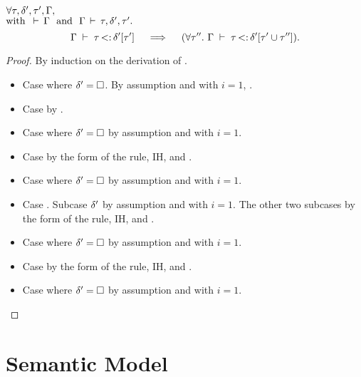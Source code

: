 \begin{lemma}%
\label{lem:add-inner-union-right:app}
    $\forall \tau, \delta', \tau', \Gamma,$\\$\text{with }
    \,\vdash\,\Gamma\ \text{ and }\ \Gamma\,\vdash\,\tau, \delta', \tau'.$
    \[
        \subtydflt{\ty}{\plug{\dctx'}{\ty'}}
        \quad\implies\quad
        (\forall \ty''.\ \subtydflt{\ty}{\plug{\dctx'}{\tyunion{\ty'}{\ty''}}}).
    \]
\end{lemma}
\begin{proof}
    By induction on the derivation of
    .
    \begin{itemize}
        \item Case  where $\delta'=\square$. By assumption
            \subtydflt{\ty}{\tyany} and  with $i=1$,
            .
        \item Case  by .
        \item Case  where $\delta'=\square$
            by assumption and  with $i=1$.
        \item Case  by the form of the rule, IH, and .
        \item Case  where $\delta'=\square$
            by assumption and  with $i=1$.
        \item Case . 
            Subcase $\delta'$ by assumption and  with $i=1$.
            The other two subcases by the form of the rule, IH, and .
        \item Case  where $\delta'=\square$
            by assumption and  with $i=1$.
        \item Case  by the form of the rule, IH, and .
        \item Case  where $\delta'=\square$
            by assumption and  with $i=1$.
    \end{itemize}
\end{proof}

\clearpage
\section{Semantic Model}\label{sec:app:sem-sub}

